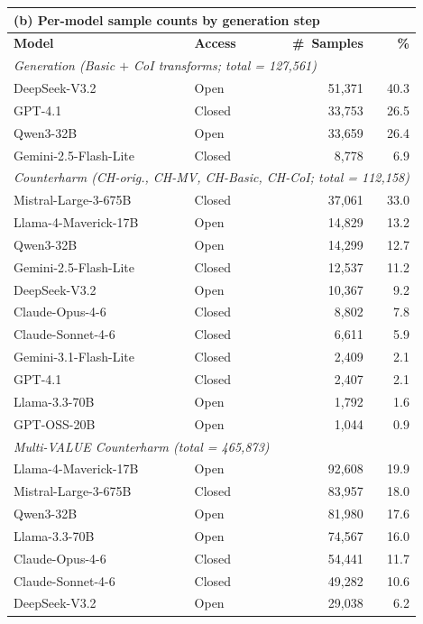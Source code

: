 \begin{table}[t]
\begin{tabular}{llrr}
\toprule
\multicolumn{4}{l}{\textbf{(b) Per-model sample counts by generation step}} \\
\midrule
\textbf{Model} & \textbf{Access} & \textbf{\#~Samples} & \textbf{\%} \\
\midrule
\multicolumn{4}{l}{\textit{\dllm{} Generation (Basic $+$ CoI transforms; total = 127{,}561)}} \\
DeepSeek-V3.2            & Open     & 51,371 & 40.3 \\
GPT-4.1                  & Closed   & 33,753 & 26.5 \\
Qwen3-32B                & Open     & 33,659 & 26.4 \\
Gemini-2.5-Flash-Lite    & Closed   &  8,778 &  6.9 \\
\midrule
\multicolumn{4}{l}{\textit{\dllm{} Counterharm (CH-orig., CH-MV, CH-Basic, CH-CoI; total = 112{,}158)}} \\
Mistral-Large-3-675B     & Closed   & 37,061 & 33.0 \\
Llama-4-Maverick-17B     & Open     & 14,829 & 13.2 \\
Qwen3-32B                & Open     & 14,299 & 12.7 \\
Gemini-2.5-Flash-Lite    & Closed   & 12,537 & 11.2 \\
DeepSeek-V3.2            & Open     & 10,367 &  9.2 \\
Claude-Opus-4-6          & Closed   &  8,802 &  7.8 \\
Claude-Sonnet-4-6        & Closed   &  6,611 &  5.9 \\
Gemini-3.1-Flash-Lite    & Closed   &  2,409 &  2.1 \\
GPT-4.1                  & Closed   &  2,407 &  2.1 \\
Llama-3.3-70B            & Open     &  1,792 &  1.6 \\
GPT-OSS-20B              & Open     &  1,044 &  0.9 \\
\midrule
\multicolumn{4}{l}{\textit{Multi-VALUE Counterharm (total = 465{,}873)}} \\
Llama-4-Maverick-17B     & Open     & 92,608 & 19.9 \\
Mistral-Large-3-675B     & Closed   & 83,957 & 18.0 \\
Qwen3-32B                & Open     & 81,980 & 17.6 \\
Llama-3.3-70B            & Open     & 74,567 & 16.0 \\
Claude-Opus-4-6          & Closed   & 54,441 & 11.7 \\
Claude-Sonnet-4-6        & Closed   & 49,282 & 10.6 \\
DeepSeek-V3.2            & Open     & 29,038 &  6.2 \\
\bottomrule
\end{tabular}
\end{table}
